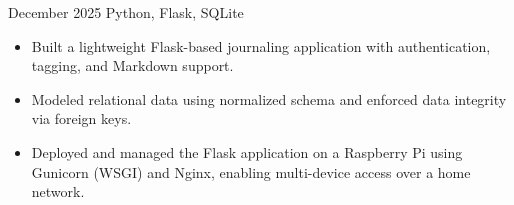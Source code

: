 
{December 2025}
{Python, Flask, SQLite}
\begin{itemize}
	\item Built a lightweight Flask-based journaling application with authentication, tagging, and Markdown support.
  \item Modeled relational data using normalized schema and enforced data integrity via foreign keys.
  \item Deployed and managed the Flask application on a Raspberry Pi using Gunicorn (WSGI) and Nginx, enabling multi-device access over a home network.
\end{itemize}
